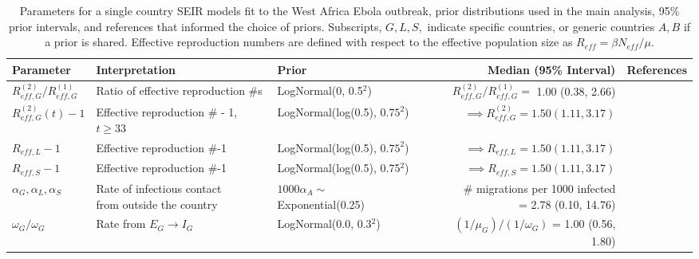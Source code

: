 \begin{table}
	\begin{fullpage}
		\caption[Parameters and priors for single country SEIR models fit to the West Africa Ebola outbreak.]{Parameters for a single country SEIR models fit to the West Africa Ebola outbreak, prior distributions used in the main analysis, 95\% prior intervals, and references that informed the choice of priors. Subscripts, $ G,L,S, $ indicate specific countries, or generic countries $ A,B $ if a prior is shared. Effective reproduction numbers are defined with respect to the effective population size as $ R_{eff} = \beta N_{eff} /\mu $.}
		\label{tab:ebola_priors_single_tight}
		\scriptsize
		\centering
		\begin{tabular}{lllrr}
			\hline
			\textbf{Parameter} &  \textbf{Interpretation} & \textbf{Prior} & \textbf{Median (95\% Interval)} & \textbf{References} \\ \hline
			$ R_{eff,G}^{(2)} / R_{eff,G}^{(1)} $ & Ratio of effective reproduction \#s &  LogNormal(0, 0.5$ ^2 $) & $ R_{eff,G}^{(2)} / R_{eff,G}^{(1)} = $ 1.00 (0.38, 2.66) & \cite{chowell2014transmission,chretien2015mathematical,coltart2017ebola,king2015avoidable} \\
			$ R_{eff,G}^{(2)}(t)-1 $ & Effective reproduction \# - 1, $ t\geq33 $ & LogNormal(log(0.5), $ 0.75^2 $) & $ \implies R_{eff,G}^{(2)} = 1.50 (1.11, 3.17)$ &  \cite{chowell2014transmission,chretien2015mathematical,coltart2017ebola,king2015avoidable} \\
			$ R_{eff,L} -1 $ & Effective reproduction \#-1 &  LogNormal(log(0.5), $ 0.75^2 $) & $ \implies R_{eff,L} = 1.50 (1.11, 3.17)$ &  \cite{chowell2014transmission,chretien2015mathematical,coltart2017ebola,king2015avoidable} \\
			$ R_{eff,S}-1 $ & Effective reproduction \#-1 & LogNormal(log(0.5), 0.75$ ^2 $) & $ \implies R_{eff,S} = 1.50 (1.11, 3.17)$ &  \cite{chowell2014transmission,chretien2015mathematical,coltart2017ebola,king2015avoidable}\\
			$ \alpha_{G},\alpha_{L}, \alpha_{S}$ & \makecell[l]{Rate of infectious contact \\ from outside the country} & $ 1000\alpha_{A} \sim$ Exponential(0.25) & \makecell[r]{\# migrations per 1000 infected \\ = 2.78 (0.10, 14.76)} & \cite{dudas2017virus}\\ 
			$ \omega_G/\omega_G $ & Rate from $ E_G\rightarrow I_G $ & LogNormal(0.0, 0.3$ ^2 $) & $ (1/\mu_G)\big/(1/\omega_G) $ = 1.00 (0.56, 1.80) & \cite{chowell2014transmission,velasquez2015time,glynn2017variability} \\

\end{tabular}
\end{fullpage}
\end{table}
